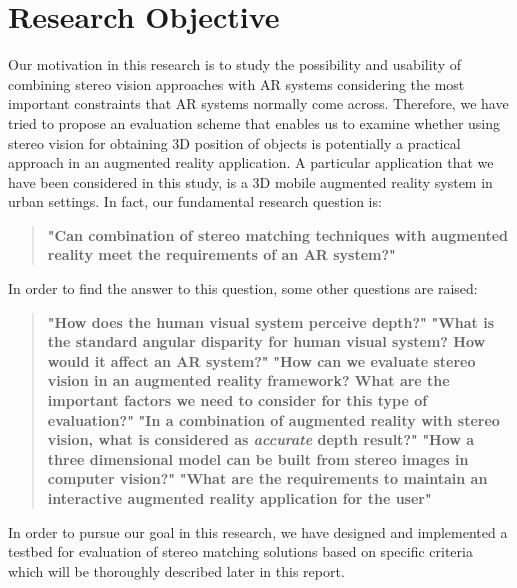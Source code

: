 \documentclass[12pt]{report}
\begin{document}
\section {Research Objective}

Our motivation in this research is to study the possibility and usability of combining stereo vision approaches with AR systems considering the most important constraints that AR systems
normally come across. Therefore, we have tried to propose an evaluation scheme that enables us to examine whether using stereo vision
for obtaining 3D position of objects is potentially a practical approach in an augmented reality application. A particular application that we have been considered in
this study, is a 3D mobile augmented reality system in urban settings. 
In fact, our fundamental research question is: \newline

\begin{quote}
\textbf{"Can combination of stereo matching techniques with augmented reality meet the requirements of an AR system?"} \newline
\end{quote}

In order to find the answer to this question, some other questions are raised:
\begin{quote}
\textbf {"How does the human visual system perceive depth?"}\newline
\textbf {"What is the standard angular disparity for human visual system? How would it affect an AR system?"} \newline
\textbf {"How can we evaluate stereo vision in an augmented reality framework? What are the important factors we need to consider for 
	this type of evaluation?"} \newline
\textbf {"In a combination of augmented reality with stereo vision, what is considered as \textbf{\textit {accurate}} depth result?"} \newline
\textbf {"How a three dimensional model can be built from stereo images in computer vision?"}\newline
\textbf {"What are the requirements to maintain an interactive augmented reality application for the user"} \newline
\end{quote}

In order to pursue our goal in this research, we have designed and implemented a testbed for evaluation of
stereo matching solutions based on specific criteria which will be thoroughly described later in this report.
\end{document}

